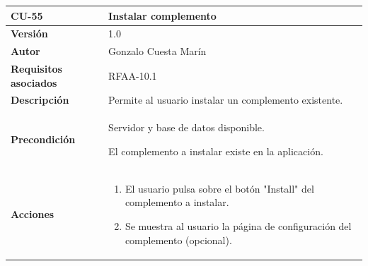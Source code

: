 \documentclass[
]{article}
\providecommand{\tightlist}{%
  \setlength{\itemsep}{0pt}\setlength{\parskip}{0pt}}
\begin{document}
\begin{longtable}[]{@{}ll@{}}
\toprule
\begin{minipage}[b]{0.24\columnwidth}\raggedright
\textbf{CU-55}\strut
\end{minipage} & \begin{minipage}[b]{0.71\columnwidth}\raggedright
\textbf{Instalar complemento}\strut
\end{minipage}\tabularnewline
\midrule
\endhead
\begin{minipage}[t]{0.24\columnwidth}\raggedright
\textbf{Versión}\strut
\end{minipage} & \begin{minipage}[t]{0.71\columnwidth}\raggedright
1.0\strut
\end{minipage}\tabularnewline
\begin{minipage}[t]{0.24\columnwidth}\raggedright
\textbf{Autor}\strut
\end{minipage} & \begin{minipage}[t]{0.71\columnwidth}\raggedright
Gonzalo Cuesta Marín\strut
\end{minipage}\tabularnewline
\begin{minipage}[t]{0.24\columnwidth}\raggedright
\textbf{Requisitos asociados}\strut
\end{minipage} & \begin{minipage}[t]{0.71\columnwidth}\raggedright
RFAA-10.1\strut
\end{minipage}\tabularnewline
\begin{minipage}[t]{0.24\columnwidth}\raggedright
\textbf{Descripción}\strut
\end{minipage} & \begin{minipage}[t]{0.71\columnwidth}\raggedright
Permite al usuario instalar un complemento existente.\strut
\end{minipage}\tabularnewline
\begin{minipage}[t]{0.24\columnwidth}\raggedright
\textbf{Precondición}\strut
\end{minipage} & \begin{minipage}[t]{0.71\columnwidth}\raggedright
Servidor y base de datos disponible.

El complemento a instalar existe en la aplicación.\strut
\end{minipage}\tabularnewline
\begin{minipage}[t]{0.24\columnwidth}\raggedright
\textbf{Acciones}\strut
\end{minipage} & \begin{minipage}[t]{0.71\columnwidth}\raggedright
\begin{enumerate}
\def\labelenumi{\arabic{enumi}.}
\tightlist
\item
  El usuario pulsa sobre el botón "Install" del complemento a instalar.
\item
  Se muestra al usuario la página de configuración del complemento
  (opcional).
\end{enumerate}


\end{minipage}
\end{longtable}
\end{document}
